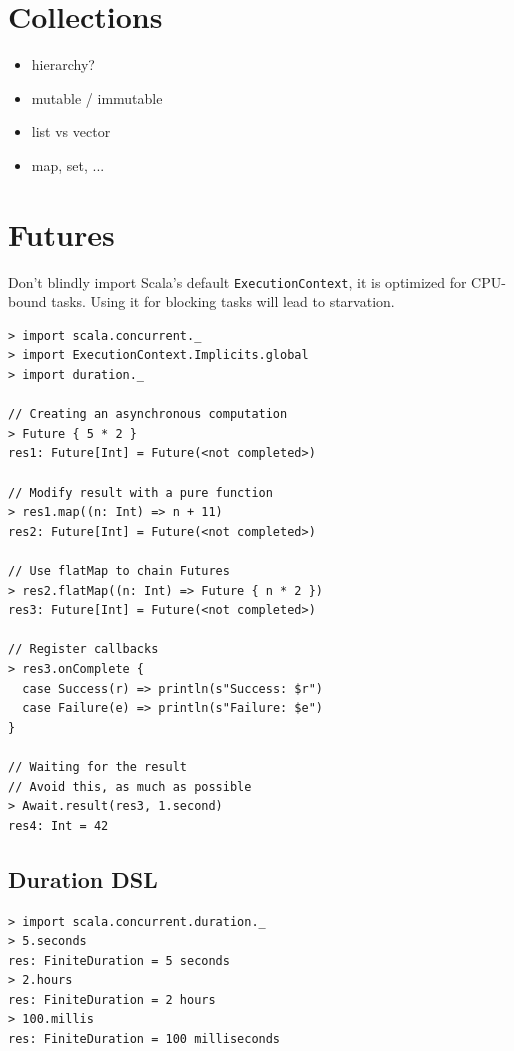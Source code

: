 \documentclass[10pt,landscape,a4paper]{article}
\newcommand{\TODO}[2][]{\todo[inline,color=green!40,linecolor=green!50,#1]{\small TODO #2}}
\begin{document}
\begin{multicols*}{4}
  \section{Collections}
  \TODO{}

  \begin{itemize}
  \item hierarchy?
  \item mutable / immutable
  \item list vs vector
  \item map, set, ...
  \end{itemize}

  \section{Futures}

  \begin{mdframed}
    Don't blindly import Scala's default \texttt{ExecutionContext}, it
    is optimized for CPU-bound tasks.  Using it for blocking tasks
    will lead to starvation.
  \end{mdframed}

\begin{verbatim}
> import scala.concurrent._
> import ExecutionContext.Implicits.global
> import duration._

// Creating an asynchronous computation
> Future { 5 * 2 }
res1: Future[Int] = Future(<not completed>)

// Modify result with a pure function
> res1.map((n: Int) => n + 11)
res2: Future[Int] = Future(<not completed>)

// Use flatMap to chain Futures
> res2.flatMap((n: Int) => Future { n * 2 })
res3: Future[Int] = Future(<not completed>)

// Register callbacks
> res3.onComplete {
  case Success(r) => println(s"Success: $r")
  case Failure(e) => println(s"Failure: $e")
}

// Waiting for the result
// Avoid this, as much as possible
> Await.result(res3, 1.second)
res4: Int = 42
\end{verbatim}
  \subsection{Duration DSL}

\begin{verbatim}
> import scala.concurrent.duration._
> 5.seconds
res: FiniteDuration = 5 seconds
> 2.hours
res: FiniteDuration = 2 hours
> 100.millis
res: FiniteDuration = 100 milliseconds
\end{verbatim}


\end{multicols*}
\end{document}
